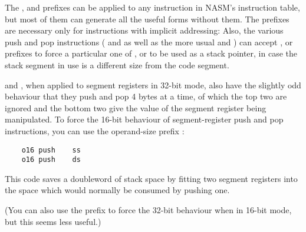 The ,  and  prefixes can be applied to
any instruction in NASM's instruction table, but most of them can
generate all the useful forms without them. The prefixes are necessary
only for instructions with implicit addressing:
Also, the various push and pop instructions ( and 
as well as the more usual  and ) can accept
,  or  prefixes to force a particular
one of ,  or  to be used as a stack pointer,
in case the stack segment in use is a different size from the code segment.

 and , when applied to segment registers in 32-bit
mode, also have the slightly odd behaviour that they push and pop 4
bytes at a time, of which the top two are ignored and the bottom two
give the value of the segment register being manipulated. To force
the 16-bit behaviour of segment-register push and pop instructions,
you can use the operand-size prefix :

\begin{lstlisting}
    o16 push    ss
    o16 push    ds
\end{lstlisting}

This code saves a doubleword of stack space by fitting two segment
registers into the space which would normally be consumed by pushing
one.

(You can also use the  prefix to force the 32-bit behaviour
when in 16-bit mode, but this seems less useful.)
